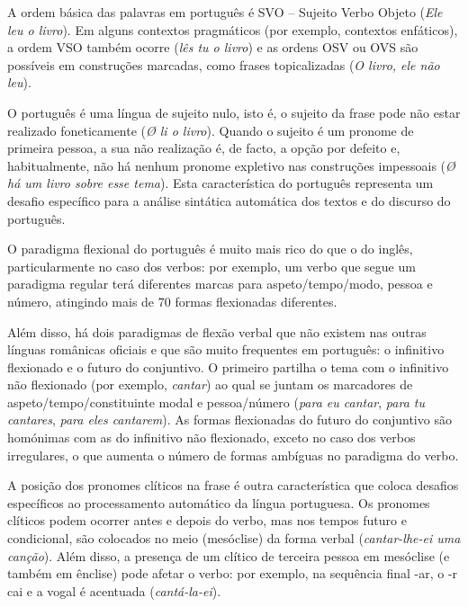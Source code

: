 \documentclass[]{../metanetpaper}
\begin{document}
\begin{multicols}{2}
A ordem básica das palavras em português é SVO – Sujeito Verbo Objeto (\textit{Ele leu o livro}). Em alguns contextos pragmáticos (por exemplo, contextos enfáticos), a ordem VSO também ocorre (\textit{lês tu o livro}) e as ordens OSV ou OVS são possíveis em construções marcadas, como frases topicalizadas (\textit{O livro, ele não leu}).




O português é uma língua de sujeito nulo, isto é, o sujeito da frase pode não estar realizado foneticamente (\textit{Ø li o livro}). Quando o sujeito é um pronome de primeira pessoa, a sua não realização é, de facto, a opção por defeito e, habitualmente, não há ne\-nhum pronome expletivo nas construções impessoais (\textit{Ø há um livro sobre esse tema}). Esta característica do português representa um desafio específico para a análise sintática automática dos textos e do discurso do português.

O paradigma flexional do português é muito mais rico do que o do inglês, particularmente no caso dos verbos: por exemplo, um verbo que segue um paradigma regular terá diferentes marcas para aspeto/tempo/modo, pessoa e número, atingindo mais de 70 formas flexionadas diferentes.


Além disso, há dois paradigmas de flexão verbal que não existem nas outras línguas românicas oficiais e que são muito frequentes em português: o infinitivo flexionado e o futuro do conjuntivo. O primeiro partilha o tema com o infinitivo não flexionado (por exemplo, \textit{cantar}) ao qual se juntam os marcadores de aspeto/tempo/constituinte modal e pessoa/número (\textit{para eu cantar}, \textit{para tu cantares}, \textit{para eles cantarem}). As formas flexionadas do futuro do conjuntivo são homónimas com as do infinitivo não flexionado, exceto no caso dos verbos irregulares, o que aumenta o número de formas ambíguas no paradigma do verbo.

A posição dos pronomes clíticos na frase é outra ca\-rac\-te\-rís\-ti\-ca que coloca desafios específicos ao processamento automático da língua portuguesa. Os pronomes clíticos podem ocorrer antes e depois do verbo, mas nos tempos futuro e condicional, são colocados no meio (mesóclise) da forma verbal (\textit{cantar-lhe-ei uma canção}). Além disso, a presença de um clítico de terceira pessoa em mesóclise (e também em ênclise) pode afetar o verbo: por exemplo, na sequência final -ar, o -r cai e a vogal é acentuada (\textit{cantá-la-ei}).




\end{multicols}
\end{document}

